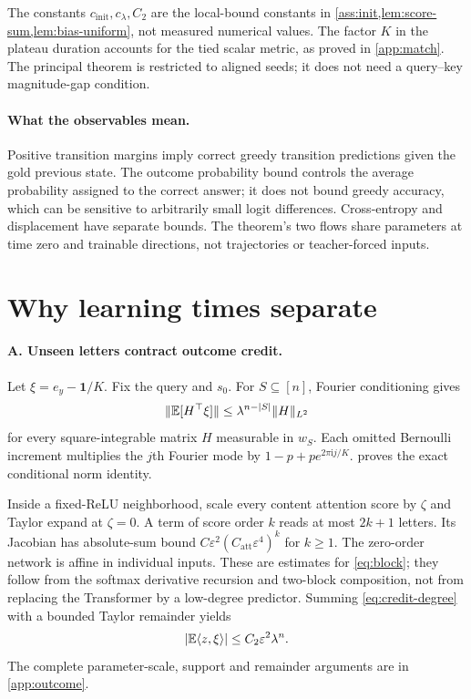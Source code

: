 The constants $c_{\mathrm{init}},c_\lambda,C_2$ are the local-bound constants in \cref{ass:init,lem:score-sum,lem:bias-uniform}, not measured numerical values. The factor $K$ in the plateau duration accounts for the tied scalar metric, as proved in \cref{app:match}. The principal theorem is restricted to aligned seeds; it does not need a query--key magnitude-gap condition.

\paragraph{What the observables mean.}
Positive transition margins imply correct greedy transition predictions given the gold previous state. The outcome probability bound controls the average probability assigned to the correct answer; it does not bound greedy accuracy, which can be sensitive to arbitrarily small logit differences. Cross-entropy and displacement have separate bounds. The theorem's two flows share parameters at time zero and trainable directions, not trajectories or teacher-forced inputs.

\section{Why learning times separate}\label{sec:credit}
\paragraph{A. Unseen letters contract outcome credit.}
Let $\xi=e_y-\mathbf1/K$. Fix the query and $s_0$. For $S\subseteq[n]$, Fourier conditioning gives
\begin{equation}\label{eq:credit-degree}
\|\mathbb E[H^\top\xi]\|\le\lambda^{n-|S|}\|H\|_{L^2}
\end{equation}
for every square-integrable matrix $H$ measurable in $w_S$. Each omitted Bernoulli increment multiplies the $j$th Fourier mode by $1-p+p e^{2\pi\mathrm i j/K}$.  proves the exact conditional norm identity.

Inside a fixed-ReLU neighborhood, scale every content attention score by $\zeta$ and Taylor expand at $\zeta=0$. A term of score order $k$ reads at most $2k+1$ letters. Its Jacobian has absolute-sum bound $C\varepsilon^2(C_{\mathrm{att}}\varepsilon^4)^k$ for $k\ge1$. The zero-order network is affine in individual inputs. These are estimates for \cref{eq:block}; they follow from the softmax derivative recursion and two-block composition, not from replacing the Transformer by a low-degree predictor. Summing \cref{eq:credit-degree} with a bounded Taylor remainder yields
\[
|\mathbb E\langle z,\xi\rangle|\le C_2\varepsilon^2\lambda^n.
\]
The complete parameter-scale, support and remainder arguments are in \cref{app:outcome}.

